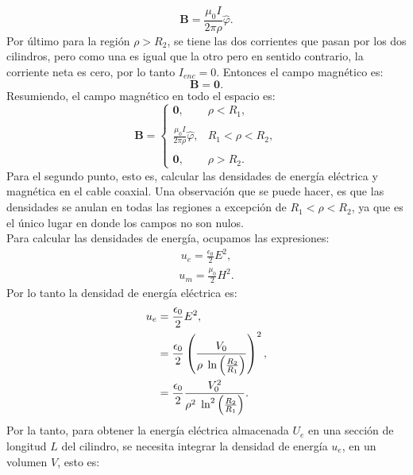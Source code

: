 \documentclass[11pt,fleqn]{book} %
\begin{document}
\begin{example}
\begin{equation}
\textbf{B}=\frac{\mu_0 I}{2\pi\rho}\hat{\varphi}.
\end{equation}
Por \'ultimo para la regi\'on $\rho>R_{2}$, se tiene las dos corrientes que pasan por los dos cilindros, pero como una es igual que la otro pero en sentido contrario, la corriente neta es cero, por lo tanto $I_{enc}=0$. Entonces el campo magn\'etico es:
\begin{equation}
 \textbf{B}=\textbf{0}.
\end{equation}
Resumiendo, el campo magn\'etico en todo el espacio es:
\begin{equation}
\mathbf{B}=\begin{cases} \textbf{0,} & \rho<R_{1},\\ & \\ \displaystyle \frac{\mu_0 I}{2\pi\rho}\hat{\varphi}, & R_{1}<\rho<R_{2}, \\ & \\ \textbf{0}, & \rho>R_{2}.\end{cases}
\end{equation}
Para el segundo punto, esto es, calcular las densidades de energ\'ia el\'ectrica y magn\'etica en el cable coaxial. Una observaci\'on que se puede hacer, es que las densidades se anulan en todas las regiones a excepci\'on de $R_{1}<\rho<R_{2}$, ya que es el \'unico lugar en donde los campos no son nulos.\\
Para calcular las densidades de energ\'ia, ocupamos las expresiones:
\begin{eqnarray*}
u_{e}=\frac{\epsilon_{0}}{2}E^{2},
\end{eqnarray*}
\begin{eqnarray*}
u_{m}=\frac{\mu_{0}}{2}H^{2}.
\end{eqnarray*}
Por lo tanto la densidad de energ\'ia el\'ectrica es:
\begin{equation}
\begin{split}
u_{e}&=\frac{\epsilon_{0}}{2}E^{2},\\
&=\frac{\epsilon_{0}}{2}\left( \frac{V_{0}}{\rho \hspace{1mm}\ln\left( \frac{R_{2}}{R_{1}} \right)} \right)^{2},\\
&=\frac{\epsilon_{0}}{2} \frac{V_{0}^{2}}{\rho^{2} \hspace{1mm}\ln^{2}\left( \frac{R_{2}}{R_{1}} \right)}.
\end{split}
\end{equation}
Por la tanto, para obtener la energ\'ia el\'ectrica almacenada $U_{e}$ en una secci\'on de longitud $L$ del cilindro, se necesita integrar la densidad de energ\'ia $u_{e}$, en un volumen $V$, esto es:

\end{example}
\end{document}
